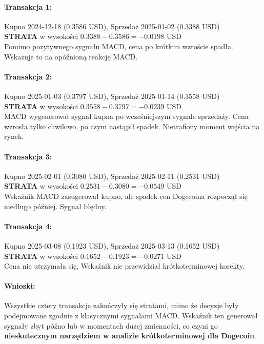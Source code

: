 \documentclass[a4paper,12pt]{article}
\begin{document}
\paragraph{Transakcja 1:\\}  
Kupno 2024-12-18 (0.3586 USD), Sprzedaż 2025-01-02 (0.3388 USD)\\  
\textbf{STRATA} w wysokości $0.3388 - 0.3586 = -0.0198$ USD \\  
Pomimo pozytywnego sygnału MACD, cena po krótkim wzroście spadła. Wskazuje to na opóźnioną reakcję MACD.

\paragraph{Transakcja 2:\\}  
Kupno 2025-01-03 (0.3797 USD), Sprzedaż 2025-01-14 (0.3558 USD)\\  
\textbf{STRATA} w wysokości $0.3558 - 0.3797 = -0.0239$ USD \\  
MACD wygenerował sygnał kupna po wcześniejszym sygnale sprzedaży. Cena wzrosła tylko chwilowo, po czym nastąpił spadek. Nietrafiony moment wejścia na rynek.

\paragraph{Transakcja 3:\\}  
Kupno 2025-02-01 (0.3080 USD), Sprzedaż 2025-02-11 (0.2531 USD)\\  
\textbf{STRATA} w wysokości $0.2531 - 0.3080 = -0.0549$ USD \\  
Wskaźnik MACD zasugerował kupno, ale spadek cen Dogecoina rozpoczął się niedługo później. Sygnał błędny.

\paragraph{Transakcja 4:\\}  
Kupno 2025-03-08 (0.1923 USD), Sprzedaż 2025-03-13 (0.1652 USD)\\  
\textbf{STRATA} w wysokości $0.1652 - 0.1923 = -0.0271$ USD \\  
Cena nie utrzymała się, Wskaźnik nie przewidział krótkoterminowej korekty.

\paragraph{Wnioski:}
Wszystkie cztery transakcje zakończyły się stratami, mimo że decyzje były podejmowane zgodnie z klasycznymi sygnałami MACD. Wskaźnik ten generował sygnały zbyt późno lub w momentach dużej zmienności, co czyni go \textbf{nieskutecznym narzędziem w analizie krótkoterminowej dla Dogecoin}. \\
\end{document}
